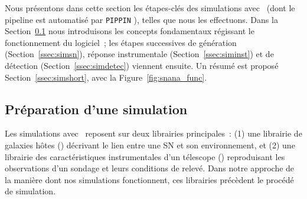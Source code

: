 \documentclass[../main/main.tex]{subfiles}
\begin{document}
Nous présentons dans cette section les étapes-clés des simulations avec \snana\
(dont le pipeline est automatisé par \texttt{PIPPIN} \citep{hinton2020}), telles
que nous les effectuons. Dans la Section~\ref{ssec:simprep} nous introduisons
les concepts fondamentaux régissant le fonctionnement du logiciel~; les étapes
successives de génération (Section~\ref{ssec:simsn}), réponse instrumentale
(Section~\ref{ssec:siminst}) et de détection (Section~\ref{ssec:simdetec})
viennent ensuite. Un résumé est proposé Section~\ref{ssec:simshort}, avec la
Figure~\ref{fig:snana_func}.

\subsection{Préparation d'une simulation}\label{ssec:simprep}

Les simulations avec \snana\ reposent sur deux librairies principales~: (1) une
librairie de galaxies hôtes (\hostlib) décrivant le lien entre une SN et son
environnement, et (2) une librairie des caractéristiques instrumentales d'un
télescope (\simlib) reproduisant les observations d'un sondage et leurs
conditions de relevé. Dans notre approche de la manière dont nos simulations
fonctionnent, ces librairies précèdent le procédé de simulation.

\subsubsection{\hostlib}\label{sssec:simlib}
\end{document}
